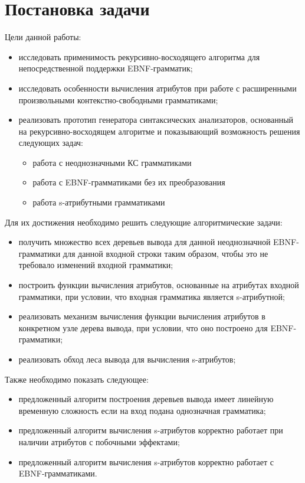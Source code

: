 \section{Постановка задачи}

Цели данной работы:
\begin{itemize}
	\item исследовать применимость рекурсивно-восходящего алгоритма для непосредственной поддержки EBNF-грамматик;
	\item исследовать особенности вычисления атрибутов при работе с расширенными произвольными контекстно-свободными грамматиками;
	\item реализовать прототип генератора синтаксических анализаторов, основанный на рекурсивно-восходящем алгоритме и показывающий возможность решения следующих задач:
		\begin{itemize}
		  \item работа с неоднозначными КС грамматиками
			\item работа с EBNF-грамматиками без их преобразования
			\item работа s-атрибутными грамматиками
		\end{itemize}
\end{itemize}

Для их достижения необходимо решить следующие алгоритмические задачи:
\begin{itemize}
	\item получить множество всех деревьев вывода для данной неоднозначной EBNF-грамматики для данной входной строки таким образом, чтобы это не требовало изменений входной грамматики;
	\item построить функции вычисления атрибутов, основанные на атрибутах входной грамматики, при условии, что входная грамматика является s-атрибутной; 
	\item реализовать механизм вычисления функции вычисления атрибутов в конкретном узле дерева вывода, при условии, что оно построено для EBNF-грамматики;
	\item реализовать обход леса вывода для вычисления s-атрибутов;
\end{itemize}
Также необходимо показать следующее:
\begin{itemize}
	\item предложенный алгоритм построения деревьев вывода имеет линейную временную сложность если на вход подана однозначная грамматика;
	\item предложенный алгоритм вычисления s-атрибутов корректно работает при наличии атрибутов с побочными эффектами;
	\item предложенный алгоритм вычисления s-атрибутов корректно работает с EBNF-грамматиками.
\end{itemize}
